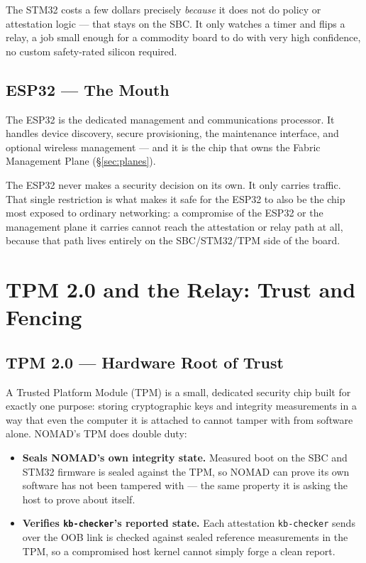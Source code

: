 \documentclass[11pt,a4paper]{article}
\begin{document}
The STM32 costs a few dollars precisely \emph{because} it does not do
policy or attestation logic --- that stays on the SBC. It only watches
a timer and flips a relay, a job small enough for a commodity board to
do with very high confidence, no custom safety-rated silicon required.

\subsection{ESP32 --- The Mouth}

The ESP32 is the dedicated management and communications processor. It
handles device discovery, secure provisioning, the maintenance
interface, and optional wireless management --- and it is the chip that
owns the Fabric Management Plane (\S\ref{sec:planes}).

The ESP32 never makes a security decision on its own. It only carries
traffic. That single restriction is what makes it safe for the ESP32 to
also be the chip most exposed to ordinary networking: a compromise of
the ESP32 or the management plane it carries cannot reach the
attestation or relay path at all, because that path lives entirely on
the SBC/STM32/TPM side of the board.

\section{TPM 2.0 and the Relay: Trust and Fencing}
\label{sec:tpm-relay}

\subsection{TPM 2.0 --- Hardware Root of Trust}

A Trusted Platform Module (TPM) is a small, dedicated security chip
built for exactly one purpose: storing cryptographic keys and integrity
measurements in a way that even the computer it is attached to cannot
tamper with from software alone. NOMAD's TPM does double duty:

\begin{itemize}
  \item \textbf{Seals NOMAD's own integrity state.} Measured boot on the
    SBC and STM32 firmware is sealed against the TPM, so NOMAD can prove
    its own software has not been tampered with --- the same property
    it is asking the host to prove about itself.
  \item \textbf{Verifies \texttt{kb-checker}'s reported state.} Each
    attestation \texttt{kb-checker} sends over the OOB link is checked
    against sealed reference measurements in the TPM, so a compromised
    host kernel cannot simply forge a clean report.
\end{itemize}
\end{document}
